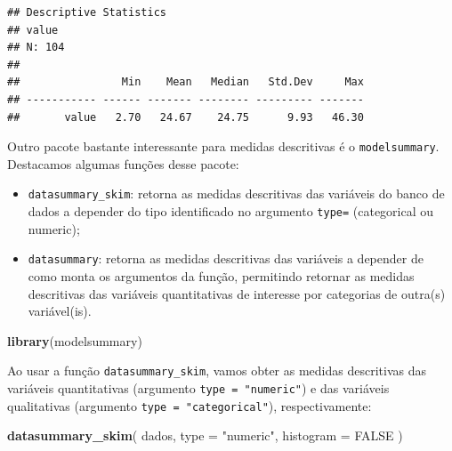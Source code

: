 \documentclass[
]{book}
\newenvironment{Shaded}{\begin{snugshade}}{\end{snugshade}}
\newcommand{\CommentTok}[1]{\textcolor[rgb]{0.56,0.35,0.01}{\textit{#1}}}
\newcommand{\DataTypeTok}[1]{\textcolor[rgb]{0.13,0.29,0.53}{#1}}
\newcommand{\KeywordTok}[1]{\textcolor[rgb]{0.13,0.29,0.53}{\textbf{#1}}}
\newcommand{\NormalTok}[1]{#1}
\newcommand{\OperatorTok}[1]{\textcolor[rgb]{0.81,0.36,0.00}{\textbf{#1}}}
\newcommand{\OtherTok}[1]{\textcolor[rgb]{0.56,0.35,0.01}{#1}}
\newcommand{\StringTok}[1]{\textcolor[rgb]{0.31,0.60,0.02}{#1}}
\begin{document}
\begin{Shaded}
\end{Shaded}

\begin{verbatim}
## Descriptive Statistics  
## value  
## N: 104  
## 
##                Min    Mean   Median   Std.Dev     Max
## ----------- ------ ------- -------- --------- -------
##       value   2.70   24.67    24.75      9.93   46.30
\end{verbatim}

Outro pacote bastante interessante para medidas descritivas é o \texttt{modelsummary}. Destacamos algumas funções desse pacote:

\begin{itemize}
\item
  \texttt{datasummary\_skim}: retorna as medidas descritivas das variáveis do banco de dados a depender do tipo identificado no argumento \texttt{type=} (categorical ou numeric);
\item
  \texttt{datasummary}: retorna as medidas descritivas das variáveis a depender de como monta os argumentos da função, permitindo retornar as medidas descritivas das variáveis quantitativas de interesse por categorias de outra(s) variável(is).
\end{itemize}

\begin{Shaded}
\begin{Highlighting}[]
\KeywordTok{library}\NormalTok{(modelsummary)}
\end{Highlighting}
\end{Shaded}

Ao usar a função \texttt{datasummary\_skim}, vamos obter as medidas descritivas das variáveis quantitativas (argumento \texttt{type\ =\ "numeric"}) e das variáveis qualitativas (argumento \texttt{type\ =\ "categorical"}), respectivamente:

\begin{Shaded}
\begin{Highlighting}[]
\KeywordTok{datasummary_skim}\NormalTok{(}
\NormalTok{  dados,}
  \DataTypeTok{type =} \StringTok{"numeric"}\NormalTok{,}
  \DataTypeTok{histogram =} \OtherTok{FALSE}
\NormalTok{)}
\end{Highlighting}
\end{Shaded}
\end{document}
